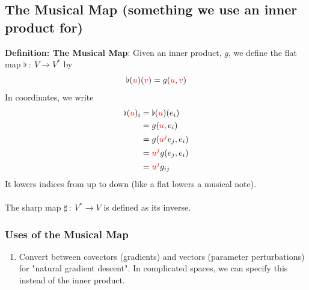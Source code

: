 \documentclass[10pt]{article}
\begin{document}
\subsection*{The Musical Map (something we use an inner product for)}
\textbf{Definition: The Musical Map}: Given an inner product, $g$, we define the flat map $\flat \::\: V \rightarrow V^*$ by
\[\flat(\textcolor{red}{u})(\textcolor{red}{v}) = g(\textcolor{red}{u}, \textcolor{red}{v})\]
In coordinates, we write
\begin{align*}
    \flat(\textcolor{red}{u})_i &= \flat(\textcolor{red}{u})(e_i)\\
    &= g(\textcolor{red}{u}, e_i)\\
    &= g(\textcolor{red}{u^j} e_j, e_i)\\
    &= \textcolor{red}{u^j} g(e_j, e_i)\\
    &= \textcolor{red}{u^j} g_{ij}
\end{align*}
It lowers indices from up to down (like a flat lowers a musical note).\\\\
The sharp map $\sharp \::\: V^* \rightarrow V$ is defined as its inverse.
\subsubsection*{Uses of the Musical Map}
\begin{enumerate}
    \item Convert between covectors (gradients) and vectors (parameter perturbations) for "natural gradient descent".  
    In complicated spaces, we can specify this instead of the inner product.
\end{enumerate}
\end{document}

